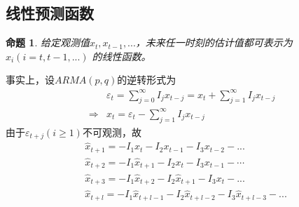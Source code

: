 \documentclass[12pt, a4paper, oneside]{ctexbook}
\newtheorem{proposition}[theorem]{命题}
\begin{document}
\subsection{线性预测函数}
\begin{proposition}
    给定观测值$x_t,x_{t-1},...$，未来任一时刻的估计值都可表示为$x_i(i = t, t-1,...)$
    的线性函数。
\end{proposition}
事实上，设$ARMA(p,q)$的逆转形式为
\begin{equation*}
    \begin{aligned}
                    & \varepsilon_t = \sum_{j=0}^{\infty}I_{j}x_{t-j}=x_t +\sum_{j=1}^{\infty}I_{j}x_{t-j} \\
        \Rightarrow & x_t = \varepsilon_t - \sum_{j=1}^{\infty}I_{j}x_{t-j}
    \end{aligned}
\end{equation*}
由于$\varepsilon_{t+j}(i\geq 1)$不可观测，故
\begin{equation*}
    \begin{aligned}
         & \hat{x}_{t+1}=-I_1x_t-I_2x_{t-1}-I_3x_{t-2}-...                                   \\
         & \hat{x}_{t+2}=-I_{1}\hat{x}_{t+1}-I_{2}x_{t}-I_{3}x_{t-1}-\cdots                  \\
         & \hat{x}_{t+3}=-I_{1}\hat{x}_{t+2}-I_{2}\hat{x}_{t+1}-I_{3}x_{t}-...               \\
         & \hat{x}_{t+l}=-I_{1}\hat{x}_{t+l-1}-I_{2}\hat{x}_{t+l-2}-I_{3}\hat{x}_{t+l-3}-...
    \end{aligned}
\end{equation*}
\end{document}
